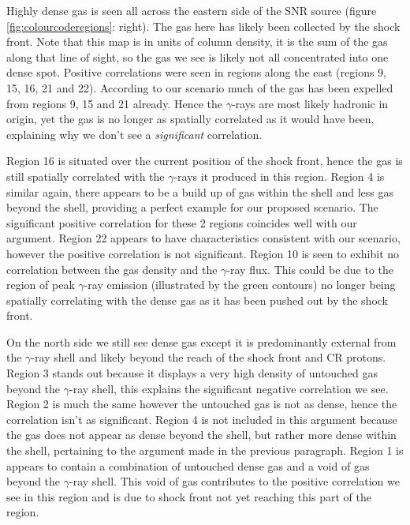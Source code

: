 \documentclass[12pt,a4paper]{article}
\begin{document}
Highly dense gas is seen all across the eastern side of the SNR source (figure \ref{fig:colourcoderegions}: right). The gas here has likely been collected by the shock front. Note that this map is in units of column density, it is the sum of the gas along that line of sight, so the gas we see is likely not all concentrated into one dense spot. Positive correlations were seen in regions along the east (regions 9, 15, 16, 21 and 22). According to our scenario much of the gas has been expelled from regions 9, 15 and 21 already. Hence the $\gamma$-rays are most likely hadronic in origin, yet the gas is no longer as spatially correlated as it would have been, explaining why we don't see a \textit{significant} correlation. 

Region 16 is situated over the current position of the shock front, hence the gas is still spatially correlated with the $\gamma$-rays it produced in this region. Region 4 is similar again, there appears to be a build up of gas within the shell and less gas beyond the shell, providing a perfect example for our proposed scenario. The significant positive correlation for these 2 regions coincides well with our argument. Region 22 appears to have characteristics consistent with our scenario, however the positive correlation is not significant. Region 10 is seen to exhibit no correlation between the gas density and the $\gamma$-ray flux. This could be due to the region of peak $\gamma$-ray emission (illustrated by the green contours) no longer being spatially correlating with the dense gas as it has been pushed out by the shock front.

On the north side we still see dense gas except it is predominantly external from the $\gamma$-ray shell and likely beyond the reach of the shock front and CR protons. Region 3 stands out because it displays a very high density of untouched gas beyond the $\gamma$-ray shell, this explains the significant negative correlation we see. Region 2 is much the same however the untouched gas is not as dense, hence the correlation isn't as significant. Region 4 is not included in this argument because the gas does not appear as dense beyond the shell, but rather more dense within the shell, pertaining to the argument made in the previous paragraph. Region 1 is appears to contain a combination of untouched dense gas and a void of gas beyond the $\gamma$-ray shell. This void of gas contributes to the positive correlation we see in this region and is due to shock front not yet reaching this part of the region. 
\end{document}
